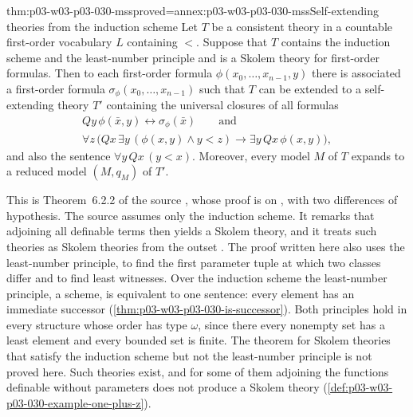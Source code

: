 \begin{hbtheorem}{thm:p03-w03-p03-030-mss}{proved=annex:p03-w03-p03-030-mss}{Self-extending theories from the induction scheme}
Let \(T\) be a consistent theory in a countable first-order vocabulary \(L\)
containing \(<\).  Suppose that \(T\) contains the induction scheme and the
least-number principle and is a Skolem theory for first-order formulas.
Then to each first-order formula \(\phi(x_0,\ldots,x_{n-1},y)\) there is
associated a first-order formula \(\sigma_\phi(x_0,\ldots,x_{n-1})\) such that
\(T\) can be extended to a self-extending theory \(T'\) containing the
universal closures of all formulas
\begin{gather*}
 Qy\,\phi(\bar x,y)\leftrightarrow\sigma_\phi(\bar x)
 \qquad\text{and}\\
 \forall z\,\bigl(Qx\,\exists y\,(\phi(x,y)\wedge y<z)\rightarrow
 \exists y\,Qx\,\phi(x,y)\bigr),
\end{gather*}
and also the sentence \(\forall y\,Qx\,(y<x)\).  Moreover, every model \(M\)
of \(T\) expands to a reduced model \((M,q_M)\) of \(T'\).
\end{hbtheorem}

This is Theorem~6.2.2 of the source
\cite[p.~206]{Schmerl1985TransferTheorems}, whose proof is on
\cite[pp.~207--208]{Schmerl1985TransferTheorems}, with two differences of
hypothesis.  The source assumes only the induction scheme.  It remarks that
adjoining all definable terms then yields a Skolem theory, and it treats
such theories as Skolem theories from the outset
\cite[p.~206]{Schmerl1985TransferTheorems}.  The proof written here also
uses the least-number principle, to find the first parameter tuple at which
two classes differ and to find least witnesses.  Over the induction scheme
the least-number principle, a scheme, is equivalent to one sentence: every
element has an immediate successor (\cref{thm:p03-w03-p03-030-is-successor}).
Both principles hold in every structure whose order has type \(\omega\),
since there every nonempty set has a least element and every bounded set is
finite.  The theorem for Skolem theories that satisfy the induction scheme
but not the least-number principle is not proved here.  Such theories exist,
and for some of them adjoining the functions definable without parameters
does not produce a Skolem theory
(\cref{def:p03-w03-p03-030-example-one-plus-z}).

